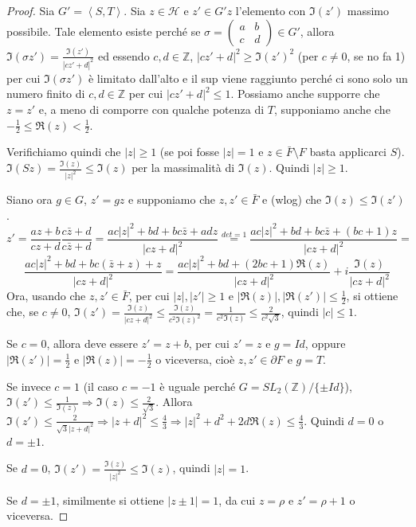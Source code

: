 \begin{proof}
Sia $G'=\left\langle S,T \right\rangle$. Sia $z \in \mathcal{H}$ e $z' \in G'z$ l'elemento con $\Im(z')$ massimo possibile. Tale elemento esiste perché se
$\sigma = \left( \begin{array}{cc} a & b \\ c & d \end{array} \right) \in G'$,
allora $\Im(\sigma z') = \frac{\Im(z')}{|cz'+d|^2}$ ed essendo
$c,d \in \mathbb{Z}$, $|cz'+d|^2 \geq \Im(z')^2$ (per $c \neq 0$, se no fa 1) per cui $\Im(\sigma z')$ è limitato dall'alto e il sup viene raggiunto perché
ci sono solo un numero finito di $c,d \in \mathbb{Z}$ per cui
$|cz'+d|^2 \leq 1$.
Possiamo anche supporre che $z=z'$ e, a meno di comporre con qualche potenza
di $T$, supponiamo anche che $-\frac{1}{2} \leq \Re(z) < \frac{1}{2}$.

Verifichiamo quindi che $|z| \geq 1$ (se poi fosse $|z|=1$ e
$z \in \bar{F} \setminus F$ basta applicarci $S$).
$\Im(Sz) = \frac{\Im(z)}{|z|^2} \leq \Im(z)$ per la massimalità di $\Im(z)$.
Quindi $|z| \geq 1$.


Siano ora $g \in G$, $z'=gz$ e supponiamo che $z,z' \in \bar{F}$ e (wlog)
che $\Im(z) \leq \Im(z')$.
$$
z'= \frac{az+b}{cz+d} \frac{c \bar{z} +d}{c \bar{z} +d} =
\frac{ac|z|^2 + bd + bc \bar{z} + adz}{|cz+d|^2} \stackrel{det=1}{=}
\frac{ac|z|^2 + bd + bc \bar{z} + (bc+1)z}{|cz+d|^2} =
$$
$$
\frac{ac|z|^2 + bd + bc (\bar{z} + z) + z}{|cz+d|^2} =
\frac{ac|z|^2 + bd + (2bc+1) \Re(z)}{|cz+d|^2} + i \frac{\Im(z)}{|cz+d|^2}
$$
Ora, usando che $z,z' \in \bar{F}$, per cui $|z|,|z'| \geq 1$ e
$|\Re(z)|, |\Re(z')| \leq \frac{1}{2}$, si ottiene che, se $c \neq 0$,
$\Im(z') = \frac{\Im(z)}{|cz+d|^2} \leq \frac{\Im(z)}{c^2 \Im(z)^2}
= \frac{1}{c^2 \Im(z)} \leq \frac{2}{c^2 \sqrt{3}}$, quindi $|c| \leq 1$.

Se $c=0$, allora deve essere $z'=z+b$, per cui $z'=z$ e $g=Id$, oppure
$|\Re(z')| = \frac{1}{2}$ e $|\Re(z)| = -\frac{1}{2}$ o viceversa,
cioè $z,z' \in \partial F$ e $g=T$.

Se invece $c=1$ (il caso $c=-1$ è uguale perché
$G=SL_2 \left( \mathbb{Z} \right)/\{\pm Id\}$),
$\Im(z') \leq \frac{1}{\Im(z)} \Rightarrow \Im(z) \leq \frac{2}{\sqrt{3}}$.
Allora $\Im(z') \leq \frac{2}{\sqrt{3}|z+d|^2} \Rightarrow
|z+d|^2 \leq \frac{4}{3} \Rightarrow |z|^2+d^2+2d \Re(z) \leq \frac{4}{3}$. 
Quindi $d=0$ o $d=\pm 1$.

Se $d=0$, $\Im(z') = \frac{\Im(z)}{|z|^2} \leq \Im(z)$, quindi $|z|=1$.

Se $d=\pm 1$, similmente si ottiene $|z \pm 1|=1$, da cui $z=\rho$ e
$z'=\rho +1$ o viceversa.


\end{proof}
